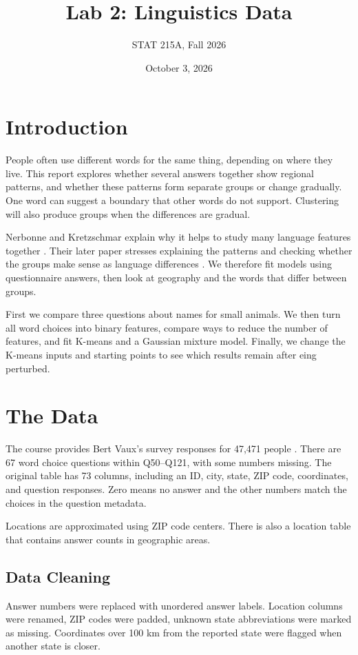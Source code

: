 \documentclass{article}
\title{Lab 2: Linguistics Data}
\author{STAT 215A, Fall 2026}
\date{October 3, 2026}
\begin{document}
\maketitle

\section{Introduction}
People often use different words for the same thing, depending on where they live. This report explores whether several answers together show regional patterns, and whether these patterns form separate groups or change gradually. One word can suggest a boundary that other words do not support. Clustering will also produce groups when the differences are gradual.

Nerbonne and Kretzschmar explain why it helps to study many language features together \cite{nerbonne2003}. Their later paper stresses explaining the patterns and checking whether the groups make sense as language differences \cite{nerbonne2006}. We therefore fit models using questionnaire answers, then look at geography and the words that differ between groups.

First we compare three questions about names for small animals. We then turn all word choices into binary features, compare ways to reduce the number of features, and fit K-means and a Gaussian mixture model. Finally, we change the K-means inputs and starting points to see which results remain after eing perturbed.

\section{The Data}
The course provides Bert Vaux's survey responses for 47,471 people \cite{survey}. There are 67 word choice questions within Q50--Q121, with some numbers missing. The original table has 73 columns, including an ID, city, state, ZIP code, coordinates, and question responses. Zero means no answer and the other numbers match the choices in the question metadata.

Locations are approximated using ZIP code centers. There is also a location table that contains answer counts in geographic areas.

\subsection{Data Cleaning}
Answer numbers were replaced with unordered answer labels. Location columns were renamed, ZIP codes were padded, unknown state abbreviations were marked as missing. Coordinates over 100 km from the reported state were flagged when another state is closer.
\end{document}
